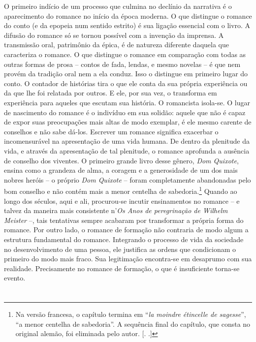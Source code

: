 O primeiro indício de um processo que culmina no declínio da
narrativa é o aparecimento do romance no início da época moderna. O que
distingue o romance do conto (e da epopeia num sentido estrito) é sua
ligação essencial com o livro. A difusão do romance só se tornou
possível com a invenção da imprensa. A transmissão oral, patrimônio da
épica, é de natureza diferente daquela que caracteriza o romance. O que
distingue o romance em comparação com todas as outras formas de prosa --
contos de fada, lendas, e mesmo novelas -- é que nem provém da tradição
oral nem a ela conduz. Isso o distingue em primeiro lugar do conto. O
contador de histórias tira o que ele conta da sua própria experiência ou
da que lhe foi relatada por outros. E ele, por sua vez, o transforma em
experiência para aqueles que escutam sua história. O romancista
isola-se. O lugar de nascimento do romance é o indivíduo em sua solidão:
aquele que não é capaz de expor suas preocupações mais altas de modo
exemplar, é ele mesmo carente de conselhos e não sabe dá-los. Escrever
um romance significa exacerbar o incomensurável na apresentação de uma
vida humana. De dentro da plenitude da vida, e através da apresentação
de tal plenitude, o romance aprofunda a ausência de conselho dos
viventes. O primeiro grande livro desse gênero, \emph{Dom Quixote},
ensina como a grandeza de alma, a coragem e a generosidade de um dos
mais nobres heróis -- o próprio \emph{Dom Quixote} -- foram
completamente abandonadas pelo bom conselho e não contém mais a menor
centelha de sabedoria.\footnote{Na versão francesa, o capítulo termina
  em ``\emph{la moindre étincelle de sagesse}'', ``a menor centelha de
  sabedoria''. A sequência final do capítulo, que consta no original
  alemão, foi eliminada pelo autor. [. .]} Quando ao longo dos
séculos, aqui e ali, procurou-se incutir ensinamentos no romance -- e
talvez da maneira mais consistente n'\emph{Os Anos de peregrinação de
Wilhelm Meister} --, tais tentativas sempre acabaram por transformar a
própria forma do romance. Por outro lado, o romance de formação não
contraria de modo algum a estrutura fundamental do romance. Integrando o
processo de vida da sociedade no desenvolvimento de uma pessoa, ele
justifica as ordens que condicionam o primeiro do modo mais fraco. Sua
legitimação encontra-se em desaprumo com sua realidade. Precisamente no
romance de formação, o que é insuficiente torna-se evento.

\section{}

